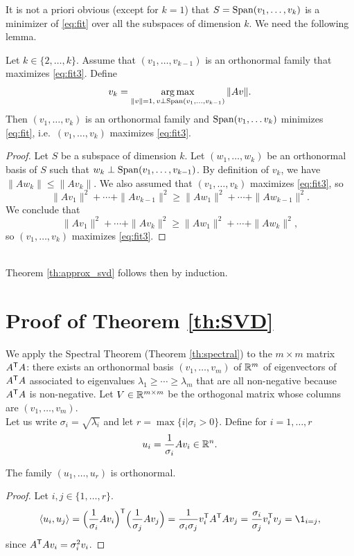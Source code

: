\documentclass[11pt,nocut]{article}
\begin{document}
It is not a priori obvious (except for $k=1$) that $S = {{\rm Span}}(v_1, \dots, v_k)$ is a minimizer of \eqref{eq:fit} over all the subspaces of dimension $k$.
We need the following lemma.

\begin{lemma}\label{lem:svd_rec}
	Let $k \in \{2, \dots, k\}$. Assume that $(v_1, \dots, v_{k-1})$ is an orthonormal family that maximizes \eqref{eq:fit3}.
	Define 
	$$
	v_k = \operatorname*{arg\,max}_{\|v\| = 1, \, v \perp {{\rm Span}}(v_1, \dots, v_{k-1})} \|Av\|.
	$$
	Then $(v_1, \dots, v_{k})$ is an orthonormal family and ${{\rm Span}}(v_1, \dots v_k)$ minimizes \eqref{eq:fit}, i.e.\ $(v_1, \dots, v_{k})$ maximizes \eqref{eq:fit3}.
\end{lemma}
\begin{proof}
	Let $S$ be a subspace of dimension $k$. Let $(w_1, \dots, w_k)$ be an orthonormal basis of $S$ such that $w_{k} \perp {{\rm Span}}(v_1, \dots, v_{k-1})$. By definition of $v_k$,
	we have $\|A w_k \| \leq \| A v_k\|$. 
	We also assumed that $(v_1, \dots, v_k)$ maximizes \eqref{eq:fit3}, so
	$$
	\|A v_1\|^2 + \cdots + \| A v_{k-1} \|^2 \geq
	\|A w_1\|^2 + \cdots+ \| A w_{k-1} \|^2.
	$$
	We conclude that
	$$
	\|A v_1\|^2 + \cdots + \| A v_{k} \|^2 \geq
	\|A w_1\|^2 + \cdots + \| A w_{k} \|^2,
	$$
	so $(v_1, \dots, v_k)$ maximizes \eqref{eq:fit3}.
\end{proof}
\\

Theorem \ref{th:approx_svd} follows then by induction.

\section*{Proof of Theorem \ref{th:SVD}}
We apply the Spectral Theorem (Theorem \ref{th:spectral}) to the $m \times m$ matrix $A^{{\sf T}} A$: there exists an orthonormal basis $(v_1, \dots, v_m)$ of $\mathbb{R}^m$ of eigenvectors of $A^{{\sf T}} A$ associated to eigenvalues $\lambda_1 \geq \cdots \geq \lambda_m$ that are all non-negative because $A^{{\sf T}} A$ is non-negative.
Let $V \in \mathbb{R}^{m \times m}$ be the orthogonal matrix whose columns are $(v_1, \dots, v_m)$.
\\

Let us write $\sigma_i = \sqrt{\lambda_i}$ and let $r = \max\{ i | \sigma_i > 0\}$.
Define for $i = 1, \dots, r$
\begin{equation}\label{eq:def_u}
	u_i = \frac{1}{\sigma_i} A v_i \in \mathbb{R}^n.
\end{equation}
\begin{lemma}
	The family $(u_1, \dots, u_r)$ is orthonormal.
\end{lemma}
\begin{proof}
	Let $i,j \in \{1, \dots, r \}$.
	$$
	\langle u_i, u_j \rangle = \Big(\frac{1}{\sigma_i} A v_i\Big)^{\sT}\Big(\frac{1}{\sigma_j} A v_j\Big) = \frac{1}{\sigma_i \sigma_j} v_i^{\sT} A^{\sT} A v_j
	= \frac{\sigma_i}{\sigma_j} v_i^{\sT} v_j = \1_{i = j},
	$$
	since $A^{{\sf T}} A v_i = \sigma_i^2 v_i$.
\end{proof}
\end{document}
